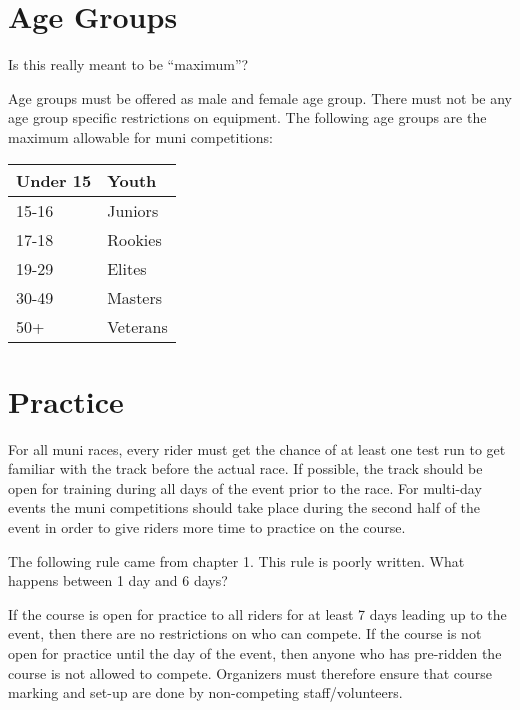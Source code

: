 \section{Age Groups}

\begin{comment2016}%
Is this really meant to be ``maximum''?
\end{comment2016}

Age groups must be offered as male and female age group.
There must not be any age group specific restrictions on equipment.
The following age groups are the maximum allowable for muni competitions:

\begin{tabular}{|l|l|}
\hline
Under 15 & Youth \\
\hline
15-16 & Juniors \\
\hline
17-18 & Rookies \\
\hline
19-29 & Elites \\
\hline
30-49 & Masters \\
\hline
50+ & Veterans \\
\hline
\end{tabular}

\section{Practice}

For all muni races, every rider must get the chance of at least one test run to get familiar with the track before the actual race.
If possible, the track should be open for training during all days of the event prior to the race.
For multi-day events the muni competitions should take place during the second half of the event in order to give riders more time to practice on the course.

\begin{comment2016}
The following rule came from chapter 1. This rule is poorly written.  What happens between 1 day and 6 days?
\end{comment2016}

If the course is open for practice to all riders for at least 7 days leading up to the event, then there are no restrictions on who can compete. 
If the course is not open for practice until the day of the event, then anyone who has pre-ridden the course is not allowed to compete. 
Organizers must therefore ensure that course marking and set-up are done by non-competing staff/volunteers.

